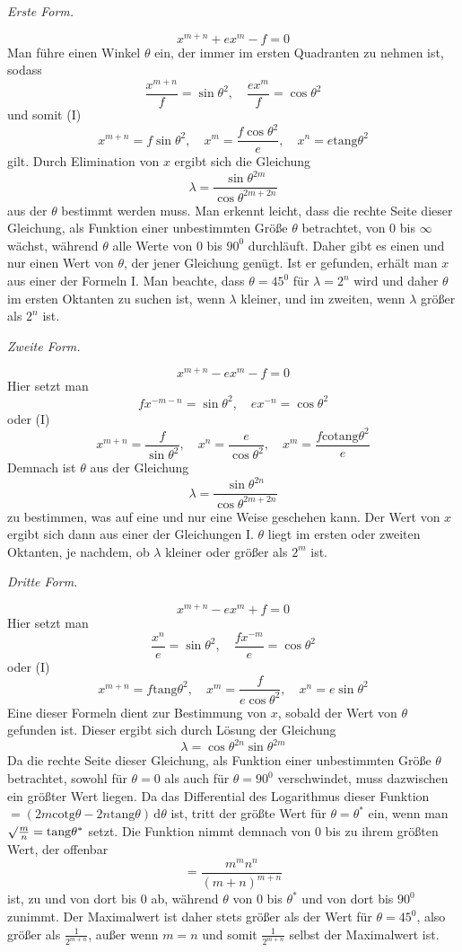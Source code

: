 \begin{center}\textit{Erste Form.}\end{center}
\[
x^{m+n}+e x^m-f=0
\]
Man führe einen Winkel $\theta$ ein, der immer im ersten Quadranten zu nehmen ist, sodass
\[
\frac{x^{m+n}}{f}=\sin\theta^2,\quad
\frac{e x^m}{f}=\cos\theta^2
\]
und somit (I)
\[
x^{m+n}=f\sin\theta^2,\quad
x^m=\frac{f\cos\theta^2}{e},\quad
x^n=e\mathrm{tang}\theta^2
\]
gilt. Durch Elimination von $x$ ergibt sich die Gleichung
\[
\lambda=\frac{\sin\theta^{2m}}{\cos\theta^{2m+2n}}
\]
aus der $\theta$ bestimmt werden muss. Man erkennt leicht, dass die rechte Seite dieser Gleichung, als Funktion einer unbestimmten Größe $\theta$ betrachtet, von $0$ bis $\infty$ wächst, während $\theta$ alle Werte von $0$ bis $90^0$ durchläuft. Daher gibt es einen und nur einen Wert von $\theta$, der jener Gleichung genügt. Ist er gefunden, erhält man $x$ aus einer der Formeln I. Man beachte, dass $\theta=45^0$ für $\lambda=2^n$ wird und daher $\theta$ im ersten Oktanten zu suchen ist, wenn $\lambda$ kleiner, und im zweiten, wenn $\lambda$ größer als $2^n$ ist.

\begin{center}\textit{Zweite Form.}\end{center}
\[
x^{m+n}-ex^m-f=0
\]
Hier setzt man
\[
fx^{-m-n}=\sin\theta^2,\quad ex^{-n}=\cos\theta^2
\]
oder (I)
\[
x^{m+n}=\frac{f}{\sin\theta^2},\quad
x^n=\frac{e}{\cos\theta^2},\quad
x^m=\frac{f\mathrm{cotang}\theta^2}{e}
\]
Demnach ist $\theta$ aus der Gleichung
\[
\lambda=\frac{\sin\theta^{2n}}{\cos\theta^{2m+2n}}
\]
zu bestimmen, was auf eine und nur eine Weise geschehen kann. Der Wert von $x$ ergibt sich dann aus einer der Gleichungen I. $\theta$ liegt im ersten oder zweiten Oktanten, je nachdem, ob $\lambda$ kleiner oder größer als $2^m$ ist.

\begin{center}\textit{Dritte Form.}\end{center}
\[
x^{m+n}-ex^m+f=0
\]
Hier setzt man
\[
\frac{x^n}{e}=\sin\theta^2,\quad
\frac{fx^{-m}}{e}=\cos\theta^2
\]
oder (I)
\[
x^{m+n}=f\mathrm{tang}\theta^2,\quad
x^m=\frac{f}{e\cos\theta^2},\quad
x^n=e\sin\theta^2
\]
Eine dieser Formeln dient zur Bestimmung von $x$, sobald der Wert von $\theta$ gefunden ist. Dieser ergibt sich durch Lösung der Gleichung
\[
\lambda=\cos\theta^{2n}\sin\theta^{2m}
\]
Da die rechte Seite dieser Gleichung, als Funktion einer unbestimmten Größe $\theta$ betrachtet, sowohl für $\theta=0$ als auch für $\theta=90^0$ verschwindet, muss dazwischen ein größter Wert liegen. Da das Differential des Logarithmus dieser Funktion $=(2m\mathrm{cotg}\theta-2n\mathrm{tang}\theta)\,\mathrm{d}\theta$ ist, tritt der größte Wert für $\theta=\theta^*$ ein, wenn man $\surd\frac{m}{n}=\mathrm{tang}\theta^*$ setzt. Die Funktion nimmt demnach von $0$ bis zu ihrem größten Wert, der offenbar
\[
=\frac{m^m n^n}{(m+n)^{m+n}}
\]
ist, zu und von dort bis $0$ ab, während $\theta$ von $0$ bis $\theta^*$ und von dort bis $90^0$ zunimmt. Der Maximalwert ist daher stets größer als der Wert für $\theta=45^0$, also größer als $\frac{1}{2^{m+n}}$, außer wenn $m=n$ und somit $\frac{1}{2^{m+n}}$ selbst der Maximalwert ist.

